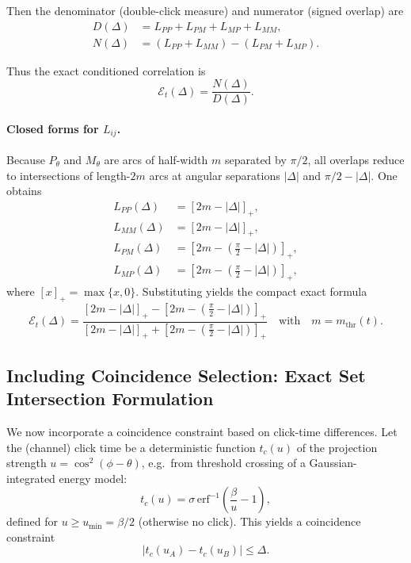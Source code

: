 Then the denominator (double-click measure) and numerator (signed overlap) are
\begin{align}
D(\Delta) &= L_{PP}+L_{PM}+L_{MP}+L_{MM},\\
N(\Delta) &= (L_{PP}+L_{MM})-(L_{PM}+L_{MP}).
\end{align}

Thus the exact conditioned correlation is
\begin{equation}
\boxed{
\mathcal{E}_t(\Delta)=\frac{N(\Delta)}{D(\Delta)}.
}
\end{equation}

\paragraph{Closed forms for $L_{ij}$.}
Because $P_\theta$ and $M_\theta$ are arcs of half-width $m$ separated by $\pi/2$, all overlaps reduce to intersections of length-$2m$ arcs at angular separations $|\Delta|$ and $\pi/2-|\Delta|$. One obtains
\begin{align}
L_{PP}(\Delta) &= [2m-|\Delta|]_+,\\
L_{MM}(\Delta) &= [2m-|\Delta|]_+,\\
L_{PM}(\Delta) &= [2m-(\tfrac{\pi}{2}-|\Delta|)]_+,\\
L_{MP}(\Delta) &= [2m-(\tfrac{\pi}{2}-|\Delta|)]_+,
\end{align}
where $[x]_+=\max\{x,0\}$.
Substituting yields the compact exact formula
\begin{equation}
\boxed{
\mathcal{E}_t(\Delta)=
\frac{[2m-|\Delta|]_+ - [2m-(\tfrac{\pi}{2}-|\Delta|)]_+}
{[2m-|\Delta|]_+ + [2m-(\tfrac{\pi}{2}-|\Delta|)]_+}
\quad\text{with}\quad m=m_{\mathrm{thr}}(t).
}
\end{equation}

\subsection{Including Coincidence Selection: Exact Set Intersection Formulation}

We now incorporate a coincidence constraint based on click-time differences. Let the (channel) click time be a deterministic function $t_c(u)$ of the projection strength $u=\cos^2(\phi-\theta)$, e.g.\ from threshold crossing of a Gaussian-integrated energy model:
\begin{equation}
t_c(u)=\sigma\,\mathrm{erf}^{-1}\!\left(\frac{\beta}{u}-1\right),
\end{equation}
defined for $u\ge u_{\min}=\beta/2$ (otherwise no click). This yields a coincidence constraint
\begin{equation}
|t_c(u_A)-t_c(u_B)|\le \Delta.
\end{equation}


